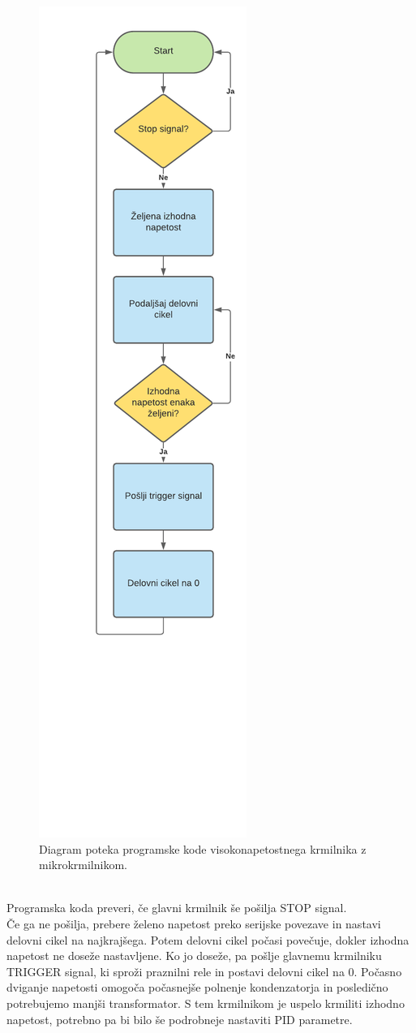 \documentclass[a4paper,twoside,openright,12pt,Slovene]{book}
\begin{document}
	\begin{figure}[H]
    \centering
    \includegraphics[width=0.35\columnwidth]{Sheme/KrmilnikzuCShema.pdf}
    \caption{\label{KrmilnikzuCShema} Diagram poteka programske kode visokonapetostnega krmilnika z mikrokrmilnikom.}
	\end{figure}
	
~\\Programska koda preveri, če glavni krmilnik še pošilja STOP signal. 
~\\Če ga ne pošilja, prebere želeno napetost preko serijske povezave in nastavi delovni cikel na najkrajšega. Potem delovni cikel počasi povečuje, dokler izhodna napetost ne doseže nastavljene. Ko jo doseže, pa pošlje glavnemu krmilniku TRIGGER signal, ki sproži praznilni rele in postavi delovni cikel na 0. Počasno dviganje napetosti omogoča počasnejše polnenje kondenzatorja in posledično potrebujemo manjši transformator. S tem krmilnikom je uspelo krmiliti izhodno napetost, potrebno pa bi bilo še podrobneje nastaviti PID parametre.
\end{document}
